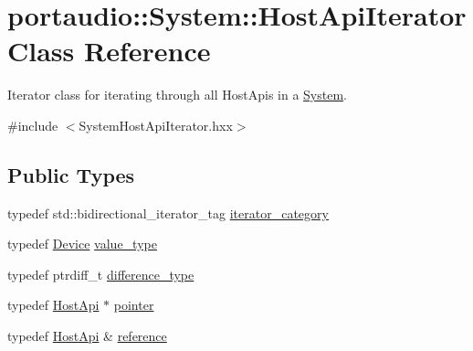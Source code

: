 \hypertarget{classportaudio_1_1_system_1_1_host_api_iterator}{}\section{portaudio\+:\+:System\+:\+:Host\+Api\+Iterator Class Reference}
\label{classportaudio_1_1_system_1_1_host_api_iterator}


Iterator class for iterating through all Host\+Apis in a \hyperlink{classportaudio_1_1_system}{System}.  




{\ttfamily \#include $<$System\+Host\+Api\+Iterator.\+hxx$>$}

\subsection*{Public Types}
\begin{DoxyCompactItemize}
\item 
typedef std\+::bidirectional\+\_\+iterator\+\_\+tag \hyperlink{classportaudio_1_1_system_1_1_host_api_iterator_a988f4cdc91839dd257b7d82be627cdf7}{iterator\+\_\+category}
\item 
typedef \hyperlink{classportaudio_1_1_device}{Device} \hyperlink{classportaudio_1_1_system_1_1_host_api_iterator_af385cfcc28e7f735be44ce2702f12854}{value\+\_\+type}
\item 
typedef ptrdiff\+\_\+t \hyperlink{classportaudio_1_1_system_1_1_host_api_iterator_aa3af97941dbfe27b3d2160543b434cc1}{difference\+\_\+type}
\item 
typedef \hyperlink{classportaudio_1_1_host_api}{Host\+Api} $\ast$ \hyperlink{classportaudio_1_1_system_1_1_host_api_iterator_aa3b63526bdfe9451e34c172fad7acfd9}{pointer}
\item 
typedef \hyperlink{classportaudio_1_1_host_api}{Host\+Api} \& \hyperlink{classportaudio_1_1_system_1_1_host_api_iterator_a6cf02d44899c4036dc8ef6c11c9758f5}{reference}
\end{DoxyCompactItemize}
